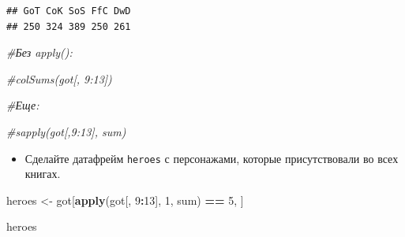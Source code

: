 \documentclass[]{book}
\newenvironment{Shaded}{\begin{snugshade}}{\end{snugshade}}
\newcommand{\KeywordTok}[1]{\textcolor[rgb]{0.13,0.29,0.53}{\textbf{#1}}}
\newcommand{\DecValTok}[1]{\textcolor[rgb]{0.00,0.00,0.81}{#1}}
\newcommand{\StringTok}[1]{\textcolor[rgb]{0.31,0.60,0.02}{#1}}
\newcommand{\CommentTok}[1]{\textcolor[rgb]{0.56,0.35,0.01}{\textit{#1}}}
\newcommand{\OperatorTok}[1]{\textcolor[rgb]{0.81,0.36,0.00}{\textbf{#1}}}
\newcommand{\NormalTok}[1]{#1}
\providecommand{\tightlist}{%
  \setlength{\itemsep}{0pt}\setlength{\parskip}{0pt}}
\begin{document}
\begin{verbatim}
## GoT CoK SoS FfC DwD 
## 250 324 389 250 261
\end{verbatim}

\begin{Shaded}
\begin{Highlighting}[]
\CommentTok{#Без apply():}

\CommentTok{#colSums(got[, 9:13])}

\CommentTok{#Еще:}

\CommentTok{#sapply(got[,9:13], sum)}
\end{Highlighting}
\end{Shaded}

\begin{itemize}
\tightlist
\item
  Сделайте датафрейм \texttt{heroes} с персонажами, которые
  присутствовали во всех книгах.
\end{itemize}

\begin{Shaded}
\begin{Highlighting}[]
\NormalTok{heroes <-}\StringTok{ }\NormalTok{got[}\KeywordTok{apply}\NormalTok{(got[, }\DecValTok{9}\OperatorTok{:}\DecValTok{13}\NormalTok{], }\DecValTok{1}\NormalTok{, sum) }\OperatorTok{==}\StringTok{ }\DecValTok{5}\NormalTok{, ]}

\NormalTok{heroes}
\end{Highlighting}
\end{Shaded}
\end{document}
